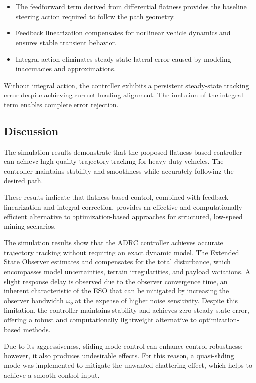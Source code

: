 \documentclass[letterpaper]{ifacconf}
\begin{document}
\begin{itemize}
\item The feedforward term derived from differential flatness provides the baseline steering action required to follow the path geometry.
\item Feedback linearization compensates for nonlinear vehicle dynamics and ensures stable transient behavior.
\item Integral action eliminates steady-state lateral error caused by modeling inaccuracies and approximations.
\end{itemize}

Without integral action, the controller exhibits a persistent steady-state tracking error despite achieving correct heading alignment. The inclusion of the integral term enables complete error rejection.

\subsection{Discussion}

The simulation results demonstrate that the proposed flatness-based controller can achieve high-quality trajectory tracking for heavy-duty vehicles. The controller maintains stability and smoothness while accurately following the desired path.

These results indicate that flatness-based control, combined with feedback linearization and integral correction, provides an effective and computationally efficient alternative to optimization-based approaches for structured, low-speed mining scenarios.


The simulation results show that the ADRC controller achieves accurate trajectory tracking without requiring an exact dynamic model. The Extended State Observer estimates and compensates for the total disturbance, which encompasses model uncertainties, terrain irregularities, and payload variations. A slight response delay is observed due to the observer convergence time, an inherent characteristic of the ESO that can be mitigated by increasing the observer bandwidth $\omega_o$ at the expense of higher noise sensitivity. Despite this limitation, the controller maintains stability and achieves zero steady-state error, offering a robust and computationally lightweight alternative to optimization-based methods.


Due to its aggressiveness, sliding mode control can enhance control robustness; however, it also produces undesirable effects. For this reason, a quasi-sliding mode was implemented to mitigate the unwanted chattering effect, which helps to achieve a smooth control input.
\end{document}
